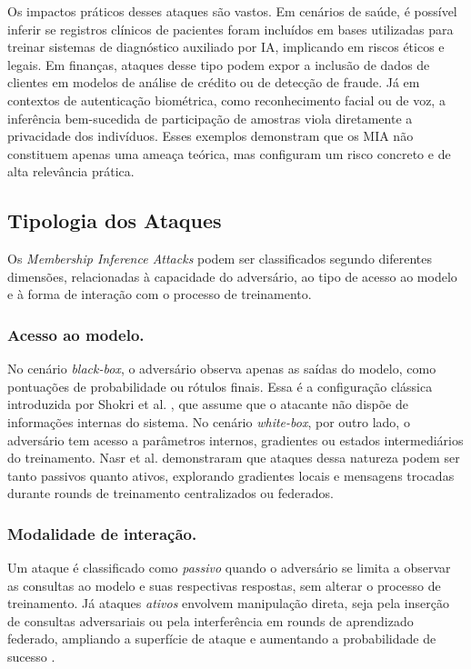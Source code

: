 \documentclass[
	12pt,				%
	openright,			%
	oneside,			%
	a4paper,			%
	english,			%
	french,				%
	spanish,			%
	brazil,				%
	]{abntex2}
\begin{document}
Os impactos práticos desses ataques são vastos. Em cenários de saúde, é possível inferir se registros clínicos de pacientes foram incluídos em bases utilizadas para treinar sistemas de diagnóstico auxiliado por IA, implicando em riscos éticos e legais. Em finanças, ataques desse tipo podem expor a inclusão de dados de clientes em modelos de análise de crédito ou de detecção de fraude. Já em contextos de autenticação biométrica, como reconhecimento facial ou de voz, a inferência bem-sucedida de participação de amostras viola diretamente a privacidade dos indivíduos. Esses exemplos demonstram que os MIA não constituem apenas uma ameaça teórica, mas configuram um risco concreto e de alta relevância prática.


\subsection{Tipologia dos Ataques}
\label{subsec:mia_taxonomia}

Os \textit{Membership Inference Attacks} podem ser classificados segundo diferentes dimensões, relacionadas à capacidade do adversário, ao tipo de acesso ao modelo e à forma de interação com o processo de treinamento.

\subsubsection{\textbf{Acesso ao modelo.}}
No cenário \textit{black-box}, o adversário observa apenas as saídas do modelo, como pontuações de probabilidade ou rótulos finais. Essa é a configuração clássica introduzida por Shokri et al. \cite{shokri2017mia}, que assume que o atacante não dispõe de informações internas do sistema. 
No cenário \textit{white-box}, por outro lado, o adversário tem acesso a parâmetros internos, gradientes ou estados intermediários do treinamento. Nasr et al. \cite{nasr2019comprehensive} demonstraram que ataques dessa natureza podem ser tanto passivos quanto ativos, explorando gradientes locais e mensagens trocadas durante rounds de treinamento centralizados ou federados.

\subsubsection{\textbf{Modalidade de interação.}}
Um ataque é classificado como \textit{passivo} quando o adversário se limita a observar as consultas ao modelo e suas respectivas respostas, sem alterar o processo de treinamento. 
Já ataques \textit{ativos} envolvem manipulação direta, seja pela inserção de consultas adversariais ou pela interferência em rounds de aprendizado federado, ampliando a superfície de ataque e aumentando a probabilidade de sucesso \cite{nasr2019comprehensive}.
\end{document}
